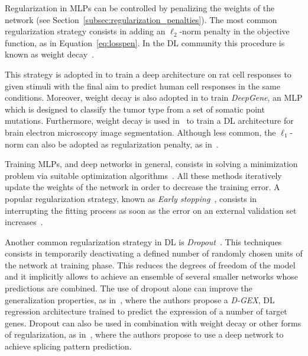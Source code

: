 	    Regularization in MLPs can be controlled by penalizing the weights of the network (see Section~\ref{subsec:regularization_penalties}). The most common regularization strategy consists in adding an $\ell_2$-norm penalty in the objective function, as in Equation~\eqref{eq:losspen}. In the DL community this procedure is known as weight decay~\cite{krogh1992simple}.

	    This strategy is adopted in \cite{Chen2015TransspeciesLO} to train a deep architecture on rat cell responses to given stimuli with the final aim to predict human cell responses in the same conditions.
	    Moreover, weight decay is also adopted in \cite{Yuan2016DeepGeneAA} to train \textit{DeepGene}, \ie an MLP which is designed to classify the tumor type from a set of somatic point mutations.
	    Furthermore, weight decay is used in~\cite{Fakhry2016DeepMF} to train a DL architecture for brain electron microscopy image segmentation.
	    Although less common, the $\ell_1$-norm can also be adopted as regularization penalty, as in~\cite{leung2014deep}.

	    Training MLPs, and deep networks in general, consists in solving a minimization problem via suitable optimization algorithms~\cite{ruder2016overview}. All these methods iteratively update the weights of the network in order to decrease the training error. A popular regularization strategy, known as  \textit{Early stopping}~\cite{prechelt1998early}, consists in interrupting the fitting process as soon as the error on an external validation set increases~\cite{angermueller2016deep}.

	    Another common regularization strategy in DL is \textit{Dropout}~\cite{srivastava2014dropout}. This techniques consists in temporarily deactivating a defined number of randomly chosen units of the network at training phase. This reduces the degrees of freedom of the model and it implicitly allows to achieve an ensemble of several smaller networks whose predictions are combined.
	    The use of dropout alone can improve the generalization properties, as in~\cite{Chen2016GeneEI}, where the authors propose a \textit{D-GEX}, DL regression architecture trained to predict the expression of a number of target genes. Dropout can also be used in combination with weight decay or other forms of regularization, as in~\cite{leung2014deep}, where the authors propose to use a deep network to achieve splicing pattern prediction.

